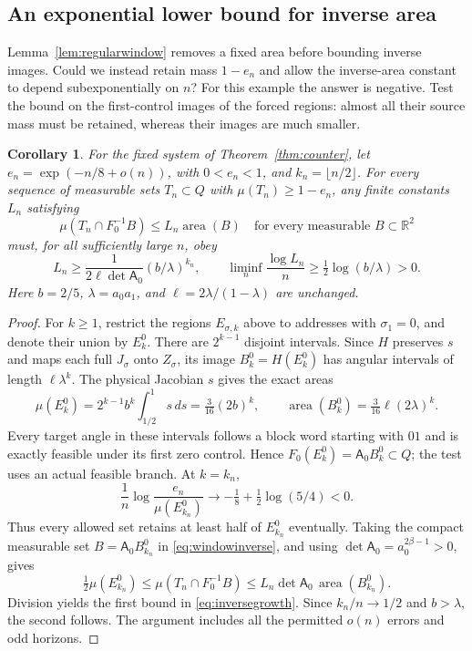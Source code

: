 \documentclass[11pt]{amsart}
\newtheorem{corollary}[theorem]{Corollary}
\theoremstyle{definition}
\theoremstyle{remark}
\newcommand{\R}{\mathbb R}
\newcommand{\area}{\operatorname{area}}
\numberwithin{equation}{section}
\begin{document}
\subsection{An exponential lower bound for inverse area}
Lemma~\ref{lem:regularwindow} removes a fixed area before bounding
inverse images. Could we instead retain mass $1-e_n$ and allow
the inverse-area constant to depend subexponentially on $n$?
For this example the answer is negative. Test the bound on the
first-control images of the forced regions: almost all their
source mass must be retained, whereas their images are much smaller.
\begin{corollary}\label{cor:inversecost}
For the fixed system of Theorem~\ref{thm:counter}, let
$e_n=\exp(-n/8+o(n))$, with $0<e_n<1$, and
$k_n=\lfloor n/2\rfloor$. For every sequence of measurable
sets $T_n\subset Q$ with $\mu(T_n)\ge1-e_n$, any finite
constants $L_n$ satisfying
\begin{equation}\label{eq:windowinverse}
\mu(T_n\cap F_0^{-1}B)\le L_n\area(B)
       \quad\text{for every measurable }B\subset\R^2
\end{equation}
must, for all sufficiently large $n$, obey
\begin{equation}\label{eq:inversegrowth}
L_n\ge\frac{1}{2\ell\det\mathsf A_0}
              (b/\lambda)^{k_n},\qquad
\liminf_n\frac{\log L_n}{n}
              \ge\tfrac12\log(b/\lambda)>0.
\end{equation}
Here $b=2/5$, $\lambda=a_0a_1$, and
$\ell=2\lambda/(1-\lambda)$ are unchanged.
\end{corollary}
\begin{proof}
For $k\ge1$, restrict the regions $E_{\sigma,k}$ above to
addresses with $\sigma_1=0$, and denote their union by $E_k^0$.
There are $2^{k-1}$ disjoint intervals. Since $H$ preserves $s$
and maps each full $J_\sigma$ onto $Z_\sigma$, its image
$B_k^0=H(E_k^0)$ has angular intervals of length $\ell\lambda^k$.
The physical Jacobian $s$ gives the exact areas
\[
\mu(E_k^0)=2^{k-1}b^k\int_{1/2}^1s\,ds
          =\tfrac3{16}(2b)^k,
\qquad
\area(B_k^0)=\tfrac3{16}\ell(2\lambda)^k.
\]
Every target angle in these intervals follows a block word starting
with $01$ and is exactly feasible under its first zero control.
Hence $F_0(E_k^0)=\mathsf A_0B_k^0\subset Q$; the test uses
an actual feasible branch. At $k=k_n$,
\[
\frac1n\log\frac{e_n}{\mu(E_{k_n}^0)}
 \longrightarrow-\tfrac18+\tfrac12\log(5/4)<0.
\]
Thus every allowed set retains at least half of $E_{k_n}^0$
eventually. Taking the compact measurable set
$B=\mathsf A_0B_{k_n}^0$ in \eqref{eq:windowinverse}, and using
$\det\mathsf A_0=a_0^{2\beta-1}>0$, gives
\[
\tfrac12\mu(E_{k_n}^0)
 \le\mu(T_n\cap F_0^{-1}B)
 \le L_n\det\mathsf A_0\,\area(B_{k_n}^0).
\]
Division yields the first bound in \eqref{eq:inversegrowth}.
Since $k_n/n\to1/2$ and $b>\lambda$, the second follows.
The argument includes all the permitted $o(n)$ errors and odd horizons.
\end{proof}
\end{document}

